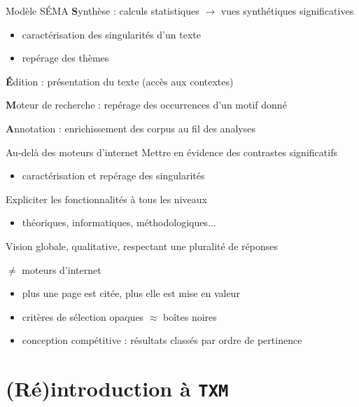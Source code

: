 \documentclass[xetex,xcolor={table,usenames,dvipsnames}]{beamer}
\newcommand{\bolder}[1]{{\color{purple}\bfseries#1}}
\begin{document}
\begin{frame}{Modèle \textsc{SÉMA}}
	\bolder{S}ynthèse : calculs statistiques $\rightarrow$ vues synthétiques significatives
	\begin{itemize}
		\item caractérisation des singularités d'un texte
		\item repérage des thèmes
	\end{itemize}
	
	\bolder{É}dition : présentation du texte (accès aux contextes)
	
	\bolder{M}oteur de recherche : repérage des occurrences d'un motif donné
	
	\bolder{A}nnotation : enrichissement des corpus au fil des analyses
\end{frame}

\begin{frame}{Au-delà des moteurs d'internet}
	Mettre en évidence des contrastes significatifs
	\begin{itemize}
	\item caractérisation et repérage des singularités
\end{itemize}	
	Expliciter les fonctionnalités à tous les niveaux 
	\begin{itemize}
		\item théoriques, informatiques, méthodologiques$\dots$
	\end{itemize}
Vision globale, qualitative, respectant une pluralité de réponses
	\medskip
	
	{\small $\neq$ moteurs d'internet
		\begin{itemize}
			\item plus une page est citée, plus elle est mise en valeur
			\item critères de sélection opaques $\approx$ \og{}boîtes noires\fg{}
			\item conception \og{}compétitive\fg{} : résultats classés par ordre de pertinence
		\end{itemize}}
	

\end{frame}

\section{(Ré)introduction à \texttt{TXM}}
\end{document}
